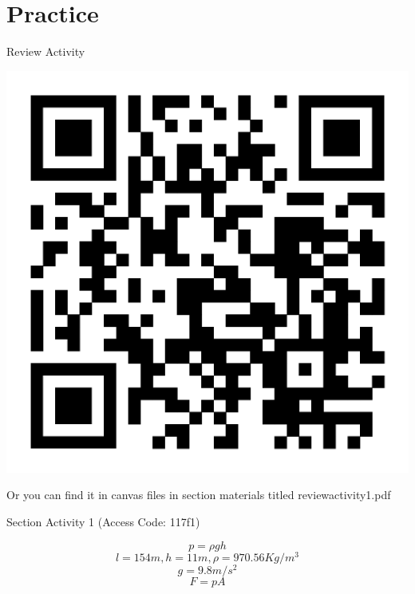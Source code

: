 \documentclass{beamer}
\begin{document}
\section{Practice}
\begin{frame}{Review Activity}

    \includegraphics[width=.6\textwidth]{activity.png}

Or you can find it in canvas files in section materials titled reviewactivity1.pdf    

\end{frame}


\begin{frame}{Section Activity 1 (Access Code: 117f1)}

\[
    p = \rho g h
\]
\[
    l = 154 m, h = 11 m, \rho = 970.56 Kg/m^3
\]
\[ g = 9.8 m/s^2 \]
\[ F = p A\]
    
\end{frame}
\end{document}
